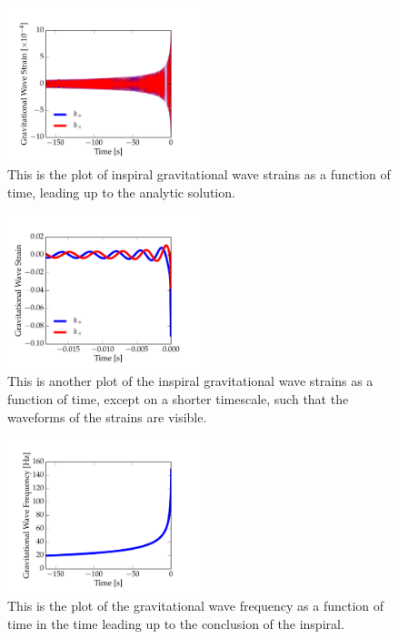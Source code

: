 \documentclass[11pt,letterpaper]{article}
\begin{document}
\begin{figure}[bth]
\centering
\includegraphics[width=0.5\textwidth]{inspiral_figs/inspiral_strains1.pdf}
\caption{This is the plot of inspiral gravitational wave strains as a function of time, leading up to the analytic solution.}
\label{fig:simpleplot2}
\end{figure}

\begin{figure}[bth]
\centering
\includegraphics[width=0.5\textwidth]{inspiral_figs/inspiral_strains2.pdf}
\caption{This is another plot of the inspiral gravitational wave strains as a function of time, except on a shorter timescale, such that the waveforms of the strains are visible.}
\label{fig:simpleplot2}
\end{figure}

\begin{figure}[bth]
\centering
\includegraphics[width=0.5\textwidth]{inspiral_figs/inspiral_freqs.pdf}
\caption{This is the plot of the gravitational wave frequency as a function of time in the time leading up to the conclusion of the inspiral.}
\label{fig:simpleplot2}
\end{figure}
\end{document}
